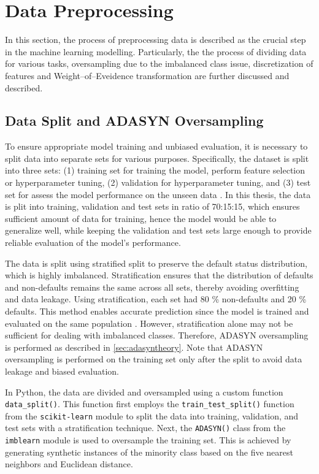 \newpage
\section{Data Preprocessing}
In this section, the process of preprocessing data is described as the crucial step in the machine learning modelling. Particularly, the the process of dividing data for various tasks, oversampling due to the imbalanced class issue, discretization of features and Weight--of--Eveidence transformation are further discussed and described.

\subsection{Data Split and ADASYN Oversampling}
\label{subsec:data-split-ADASYN}

To ensure appropriate model training and unbiased evaluation, it is necessary to split data into separate sets for various purposes. Specifically, the dataset is split into three sets: (1) training set for training the model, perform feature selection or hyperparameter tuning, (2) validation for hyperparameter tuning, and (3) test set for assess the model performance on the unseen data \citep{subasi2020practical}.
In this thesis, the data is plit into training, validation and test sets in ratio of 70:15:15, which ensures sufficient amount of data for training, hence the model would be able to generalize well, while keeping the validation and test sets large enough to provide reliable evaluation of the model's performance.

The data is split using stratified split to preserve the default status distribution, which is highly imbalanced.
Stratification ensures that the distribution of defaults and non-defaults remains the same across all sets, thereby avoiding overfitting and data leakage. Using stratification, each set had 80 \% non-defaults and 20 \% defaults. This method enables accurate prediction since the model is trained and evaluated on the same population \citep{igareta2021strat}.
However, stratification alone may not be sufficient for dealing with imbalanced classes. Therefore, ADASYN oversampling is performed as described in \autoref{sec:adasyntheory}. Note that ADASYN oversampling is performed on the training set only after the split to avoid data leakage and biased evaluation.

In Python, the data are divided and oversampled using a custom function \lstinline{data_split()}.
This function first employs the \lstinline{train_test_split()} function from the \lstinline{scikit-learn} module to split the data into training, validation, and test sets with a stratification technique.
Next, the \lstinline{ADASYN()} class from the \lstinline{imblearn} module is used to oversample the training set. This is achieved by generating synthetic instances of the minority class based on the five nearest neighbors and Euclidean distance.

